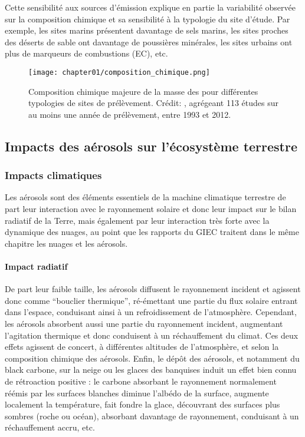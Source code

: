 Cette sensibilité aux sources d'émission explique en partie la variabilité observée sur la
composition chimique et sa sensibilité à la typologie du site d'étude. Par exemple, les
sites marins présentent davantage de sels marins, les sites proches des déserts de sable
ont davantage de poussières minérales, les sites urbains ont plus de marqueurs de
combustions (EC), etc.

\begin{figure}[ht]
    \centering
    \texttt{[image: chapter01/composition\_chimique.png]}
    \caption{Composition chimique majeure de la masse des \PMdix{} pour différentes
        typologies de sites de prélèvement. Crédit: \cite[figure 7.13]{boucherClouds2013},
        agrégeant 113 études sur au moins une année de prélèvement, entre 1993 et 2012.}%
    \label{fig:chapter01/composition_chimique}
\end{figure}

\subsection{Impacts des aérosols sur l'écosystème terrestre}%
\label{sub:impacts_des_aérosols_sur_l_écosystème_terrestre}

\subsubsection{Impacts climatiques}%
\label{ssub:impacts_climatiques}

Les aérosols sont des éléments essentiels de la machine climatique terrestre de part leur
interaction avec le rayonnement solaire et donc leur impact sur le bilan radiatif de la
Terre, mais également par leur interaction très forte avec la dynamique des nuages, au
point que les rapports du GIEC traitent dans le même chapitre les nuages et les aérosols.

\paragraph{Impact radiatif}%
\label{par:impact_radiatif}

De part leur faible taille, les aérosols diffusent le rayonnement incident et agissent donc
comme ``bouclier thermique'', ré-émettant une partie du flux solaire entrant dans l'espace,
conduisant ainsi à un refroidissement de l'atmosphère.
Cependant, les aérosols absorbent aussi une partie du rayonnement incident, augmentant
l'agitation thermique et donc conduisent à un réchauffement du climat.
Ces deux effets agissent de concert, à différentes altitudes de l'atmosphère, et selon la
composition chimique des aérosols.
Enfin, le dépôt des aérosols, et notamment du black carbone, sur la neige ou les
glaces des banquises induit un effet bien connu de rétroaction positive : le carbone
absorbant le rayonnement normalement réémis par les surfaces blanches diminue l'albédo de
la surface, augmente localement la température, fait fondre la glace, découvrant des
surfaces plus sombres (roche ou océan), absorbant davantage de rayonnement, conduisant à
un réchauffement accru, etc.

